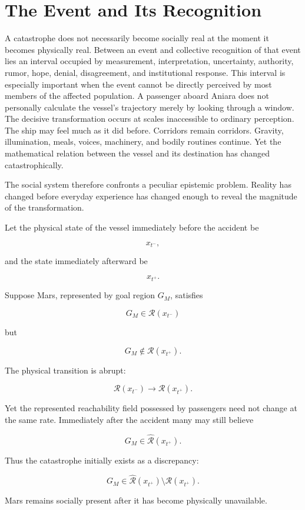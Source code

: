 \documentclass[11pt,oneside]{book}
\theoremstyle{definition}
\theoremstyle{remark}
\newcommand{\R}{\mathcal{R}}
\begin{document}
\section{The Event and Its Recognition}

A catastrophe does not necessarily become socially real at the moment it becomes physically real. Between an event and collective recognition of that event lies an interval occupied by measurement, interpretation, uncertainty, authority, rumor, hope, denial, disagreement, and institutional response. This interval is especially important when the event cannot be directly perceived by most members of the affected population. A passenger aboard Aniara does not personally calculate the vessel's trajectory merely by looking through a window. The decisive transformation occurs at scales inaccessible to ordinary perception. The ship may feel much as it did before. Corridors remain corridors. Gravity, illumination, meals, voices, machinery, and bodily routines continue. Yet the mathematical relation between the vessel and its destination has changed catastrophically.

The social system therefore confronts a peculiar epistemic problem. Reality has changed before everyday experience has changed enough to reveal the magnitude of the transformation.

Let the physical state of the vessel immediately before the accident be

\[
x_{t^-},
\]

and the state immediately afterward be

\[
x_{t^+}.
\]

Suppose Mars, represented by goal region \(G_M\), satisfies

\[
G_M\in\R(x_{t^-})
\]

but

\[
G_M\notin\R(x_{t^+}).
\]

The physical transition is abrupt:

\[
\R(x_{t^-})
\rightarrow
\R(x_{t^+}).
\]

Yet the represented reachability field possessed by passengers need not change at the same rate. Immediately after the accident many may still believe

\[
G_M\in\widehat{\R}(x_{t^+}).
\]

Thus the catastrophe initially exists as a discrepancy:

\[
G_M
\in
\widehat{\R}(x_{t^+})
\setminus
\R(x_{t^+}).
\]

Mars remains socially present after it has become physically unavailable.
\end{document}
